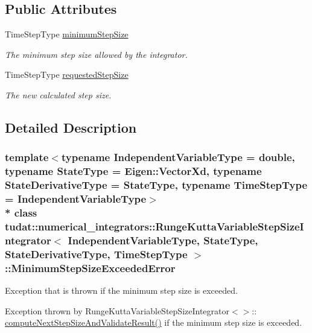 \subsection*{Public Attributes}
\begin{DoxyCompactItemize}
\item 
Time\+Step\+Type \hyperlink{classtudat_1_1numerical__integrators_1_1RungeKuttaVariableStepSizeIntegrator_1_1MinimumStepSizeExceededError_a3887ff27114314b8c7c9c8b7edfc1282}{minimum\+Step\+Size}
\begin{DoxyCompactList}\small\item\em The minimum step size allowed by the integrator. \end{DoxyCompactList}\item 
Time\+Step\+Type \hyperlink{classtudat_1_1numerical__integrators_1_1RungeKuttaVariableStepSizeIntegrator_1_1MinimumStepSizeExceededError_a1891f06b118052203b3ceaf2b10de36a}{requested\+Step\+Size}
\begin{DoxyCompactList}\small\item\em The new calculated step size. \end{DoxyCompactList}\end{DoxyCompactItemize}


\subsection{Detailed Description}
\subsubsection*{template$<$typename Independent\+Variable\+Type = double, typename State\+Type = Eigen\+::\+Vector\+Xd, typename State\+Derivative\+Type = State\+Type, typename Time\+Step\+Type = Independent\+Variable\+Type$>$\\*
class tudat\+::numerical\+\_\+integrators\+::\+Runge\+Kutta\+Variable\+Step\+Size\+Integrator$<$ Independent\+Variable\+Type, State\+Type, State\+Derivative\+Type, Time\+Step\+Type $>$\+::\+Minimum\+Step\+Size\+Exceeded\+Error}

Exception that is thrown if the minimum step size is exceeded. 

Exception thrown by Runge\+Kutta\+Variable\+Step\+Size\+Integrator$<$$>$\+:\+: \hyperlink{classtudat_1_1numerical__integrators_1_1RungeKuttaVariableStepSizeIntegrator_a2074aa4b30e623e505c990f12161a388}{compute\+Next\+Step\+Size\+And\+Validate\+Result()} if the minimum step size is exceeded. 


